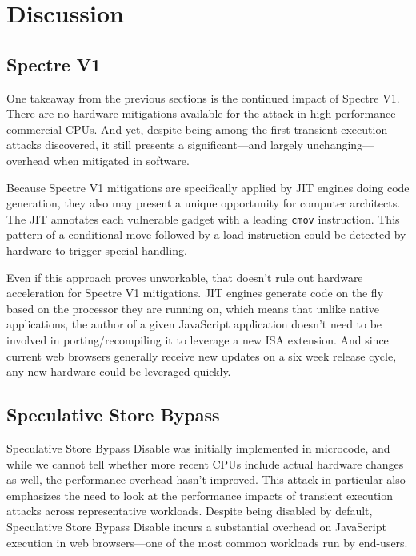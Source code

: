 \section{Discussion}
\label{s:evolution-discussion}


\subsection{Spectre V1}

One takeaway from the previous sections is the continued impact of Spectre V1.
There are no hardware mitigations available for the attack in high performance commercial CPUs.
And yet, despite being among the first transient execution attacks discovered, it still presents a significant---and largely unchanging---overhead when mitigated in software.

Because Spectre V1 mitigations are specifically applied by JIT engines doing code generation, they also may present a unique opportunity for computer architects.
The JIT annotates each vulnerable gadget with a leading \texttt{cmov} instruction.
This pattern of a conditional move followed by a load instruction could be detected by hardware to trigger special handling.

Even if this approach proves unworkable, that doesn't rule out hardware acceleration for Spectre V1 mitigations.
JIT engines generate code on the fly based on the processor they are running on, which means that unlike native applications, the author of a given JavaScript application doesn't need to be involved in porting/recompiling it to leverage a new ISA extension.
And since current web browsers generally receive new updates on a six
week release cycle, any new hardware could be leveraged quickly.

\subsection{Speculative Store Bypass}

Speculative Store Bypass Disable was initially implemented in microcode, and while we cannot tell whether more recent CPUs include actual hardware changes as well, the performance overhead hasn't improved.
This attack in particular also emphasizes the need to look at the performance impacts of transient execution attacks across representative workloads.
Despite being disabled by default, Speculative Store Bypass Disable incurs a substantial overhead on JavaScript execution in web browsers---one of the most common workloads run by end-users.

